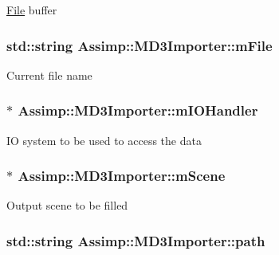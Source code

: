 \hyperlink{class_file}{File} buffer \hypertarget{class_assimp_1_1_m_d3_importer_aa3b4dd1c6270f50c1ef8b729e6a7d8b1}{
\subsubsection[{m\+File}]{\setlength{\rightskip}{0pt plus 5cm}std\+::string Assimp\+::\+M\+D3\+Importer\+::m\+File\hspace{0.3cm}{\ttfamily [protected]}}}\label{class_assimp_1_1_m_d3_importer_aa3b4dd1c6270f50c1ef8b729e6a7d8b1}
Current file name \hypertarget{class_assimp_1_1_m_d3_importer_ac4f4866611a3a308726823cf82cc20e1}{
\subsubsection[{m\+I\+O\+Handler}]{$\ast$ Assimp\+::\+M\+D3\+Importer\+::m\+I\+O\+Handler\hspace{0.3cm}{\ttfamily [protected]}}}\label{class_assimp_1_1_m_d3_importer_ac4f4866611a3a308726823cf82cc20e1}
I\+O system to be used to access the data \hypertarget{class_assimp_1_1_m_d3_importer_a4d1909bdab561c4ed858d092981ada2b}{
\subsubsection[{m\+Scene}]{$\ast$ Assimp\+::\+M\+D3\+Importer\+::m\+Scene\hspace{0.3cm}{\ttfamily [protected]}}}\label{class_assimp_1_1_m_d3_importer_a4d1909bdab561c4ed858d092981ada2b}
Output scene to be filled \hypertarget{class_assimp_1_1_m_d3_importer_a12752acfc83125a3cc595aefa569e8cb}{
\subsubsection[{path}]{\setlength{\rightskip}{0pt plus 5cm}std\+::string Assimp\+::\+M\+D3\+Importer\+::path\hspace{0.3cm}{\ttfamily [protected]}}}\label{class_assimp_1_1_m_d3_importer_a12752acfc83125a3cc595aefa569e8cb}
